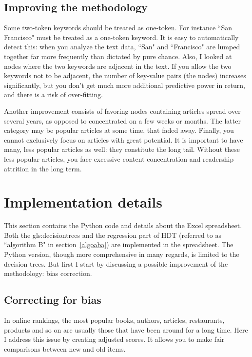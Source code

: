 \documentclass[oneside,10pt]{book}
\begin{document}
\subsection{Improving the methodology}\label{ccvcx}

Some two-token keywords should be treated as one-token. For instance ``San Francisco" must be treated as a one-token keyword. It is easy to automatically detect this: when you analyze the text data, ``San" and ``Francisco" are lumped together far more frequently than dictated by pure chance. 
Also, I looked at nodes  where the two keywords are adjacent in the text. If you allow the two keywords not to be adjacent, the number of key-value pairs (the nodes) increases significantly, but you don't get much more additional predictive power in return, and there is a risk of over-fitting. 


Another improvement consists of favoring nodes containing articles spread over several years, as opposed to concentrated on a few weeks or months. The latter category may be popular articles at some time, that faded away.
Finally, you cannot exclusively focus on articles with great potential. It is important to have many, less popular articles as well: they constitute the long tail. Without these less popular articles, you face excessive content concentration and readership attrition in the long term. 

\section{Implementation details}

This section contains the Python code and details about the Excel spreadsheet. Both the \glspl{gls:decisiontree} and the regression part of HDT (referred to as ``algorithm B" in section~\ref{algoaba}) are implemented in the spreadsheet. The Python version, though more comprehensive in many regards, is limited to the decision trees. But first
I start by discussing a possible improvement of the methodology: bias correction.

\subsection{Correcting for bias}\label{timeab}

In online rankings, the most popular books, authors, articles, restaurants, products and so on are usually those that have been around for a long time. 
Here I address this issue by creating adjusted scores. It allows you to make fair comparisons between new and old items.
\end{document}
